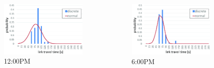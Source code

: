 \documentclass[t]{beamer}
\begin{document}
\begin{frame}
\begin{columns}
	\begin{figure}
		\centering
		\includegraphics[scale=0.2]{ltt_1200.jpg}
		\vspace{-0.05in}
		\\ 12:00PM
	\end{figure}
	\begin{figure}
		\centering
		\includegraphics[scale=0.2]{ltt_1800.jpg}
		\vspace{-0.05in}
		\\ 6:00PM
	\end{figure}
\end{columns}
\end{frame}
\end{document}
